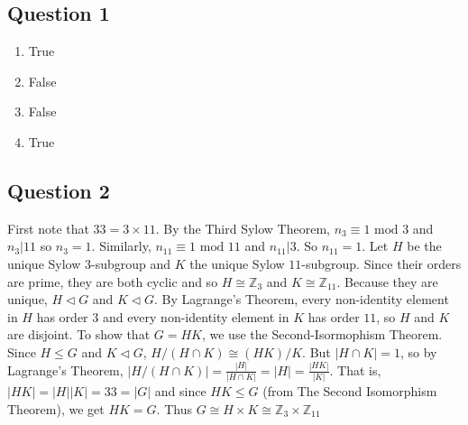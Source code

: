 \documentclass[letterpaper, 11pt]{article}
\newcommand{\Z}{\mathbb{Z}}   %
\newcommand{\1}{\mathds{1}}	%
\theoremstyle{definition}
\begin{document}
\subsection*{Question 1}
\begin{enumerate}[label=(\alph*)]
\item True
\item False
\item False
\item True
\end{enumerate}

\subsection*{Question 2}
First note that $33 = 3 \times 11$. By the Third Sylow Theorem, $n_3 \equiv 1 \text{ mod } 3$ and $n_3 | 11$ so $n_3 = 1$. Similarly, $n_{11} \equiv 1 \text{ mod } 11$ and $n_{11} | 3$. So $n_{11} = 1$. Let $H$ be the unique Sylow $3$-subgroup and $K$ the unique Sylow $11$-subgroup. Since their orders are prime, they are both cyclic and so $H \cong \Z_{3}$ and $K \cong \Z_{11}$. Because they are unique, $H \triangleleft G$ and $K \triangleleft G$.
By Lagrange's Theorem, every non-identity element in $H$ has order $3$ and every non-identity element in $K$ has order $11$, so $H$ and $K$ are disjoint.
To show that $G = HK$, we use the Second-Isormophism Theorem. Since $H \le G$ and $K \triangleleft G$, $H/(H \cap K) \cong (HK)/K$. But $|H \cap K| = 1$, so by Lagrange's Theorem, $|H/(H\cap K)| = \frac{|H|}{|H \cap K|} = |H| = \frac{|HK|}{|K|}$. That is, $|HK| = |H||K| = 33 = |G|$ and since $HK \le G$ (from The Second Isomorphism Theorem), we get $HK = G$. Thus  $G \cong H \times K \cong \Z_{3} \times \Z_{11}$
\end{document}
